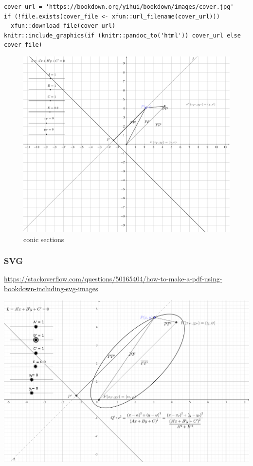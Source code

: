 \documentclass[
]{book}
\theoremstyle{definition}
\theoremstyle{definition}
\theoremstyle{definition}
\theoremstyle{definition}
\theoremstyle{remark}
\begin{document}
\begin{verbatim}
cover_url = 'https://bookdown.org/yihui/bookdown/images/cover.jpg'
if (!file.exists(cover_file <- xfun::url_filename(cover_url)))
  xfun::download_file(cover_url)
knitr::include_graphics(if (knitr::pandoc_to('html')) cover_url else cover_file)
\end{verbatim}

\begin{figure}
\includegraphics[width=0.75\linewidth]{202401280001-test_files/figure-latex/unnamed-chunk-24-1} \caption{conic sections}\label{fig:unnamed-chunk-24}
\end{figure}

\hypertarget{svg}{%
\subsubsection{SVG}\label{svg}}

\url{https://stackoverflow.com/questions/50165404/how-to-make-a-pdf-using-bookdown-including-svg-images}

\includegraphics{img/conic-sections.pdf}
\end{document}
